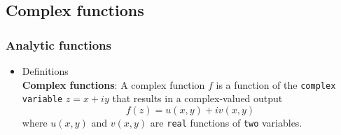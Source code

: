 \subsection{Complex functions}

\subsubsection{Analytic functions}
\begin{itemize}
	\item Definitions\\
	\textbf{Complex functions}: A complex function $f$ is a function of the \verb|complex variable| $z=x+iy$ that results in a complex-valued output
	$$
	f(z) = u(x,y) + iv(x,y)
	$$
	where $u(x,y)$ and $v(x,y) $ are \verb|real| functions of \verb|two| variables.
\end{itemize}